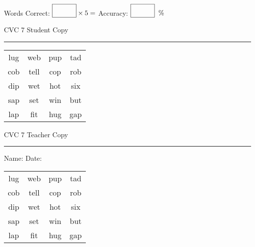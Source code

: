 \documentclass{memoir}
\begin{document}
\normalsize

Words Correct: $\fbox{\phantom{\huge 100}} \times 5 = $ Accuracy: $\fbox{\phantom{\huge 100}}\;\; \%$ 

\vfill

\newpage


\footnotesize \noindent
CVC 7 \hfill Student Copy
\smallskip
\hrule

\huge

\setlength{\tabcolsep}{14pt}
\def\arraystretch{2}

{\selectfont


\begin{vplace}[0.5]
\begin{center}
\begin{tabular}{cccc}
lug & web & pup & tad \\
cob & tell & cop & rob \\
dip & wet & hot & six \\
sap & set & win & but \\
lap & fit & hug & gap \\
\end{tabular}
\end{center}
\end{vplace}

}

\newpage

\footnotesize \noindent
CVC 7 \hfill Teacher Copy
\smallskip
\hrule

\normalsize

\vfill

\noindent
Name: \underline{\hspace{1.75in}} \hfill Date: \underline{\hspace{1in}}

\huge

{\selectfont


\begin{vplace}[0.5]
\begin{center}
\begin{tabular}{cccc}
lug & web & pup & tad \\
cob & tell & cop & rob \\
dip & wet & hot & six \\
sap & set & win & but \\
lap & fit & hug & gap \\
\end{tabular}
\end{center}
\end{vplace}



}
\end{document}
